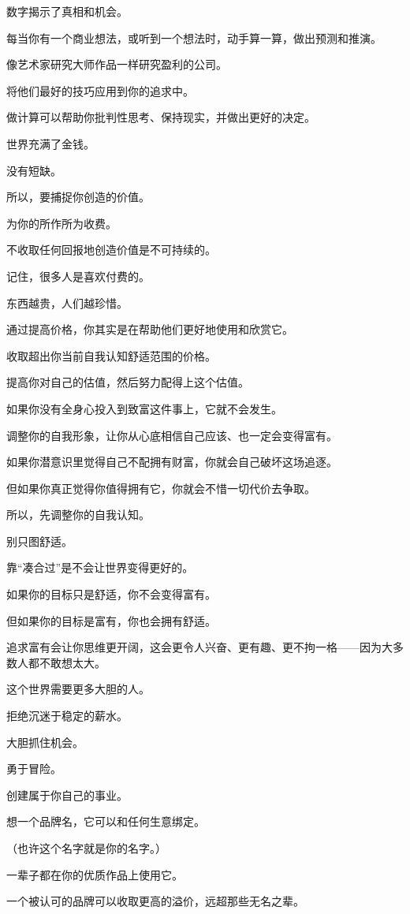 \documentclass[
]{article}
\begin{document}
数字揭示了真相和机会。

每当你有一个商业想法，或听到一个想法时，动手算一算，做出预测和推演。

像艺术家研究大师作品一样研究盈利的公司。

将他们最好的技巧应用到你的追求中。

做计算可以帮助你批判性思考、保持现实，并做出更好的决定。

世界充满了金钱。

没有短缺。

所以，要捕捉你创造的价值。

为你的所作所为收费。

不收取任何回报地创造价值是不可持续的。

记住，很多人是喜欢付费的。

东西越贵，人们越珍惜。

通过提高价格，你其实是在帮助他们更好地使用和欣赏它。

收取超出你当前自我认知舒适范围的价格。

提高你对自己的估值，然后努力配得上这个估值。

如果你没有全身心投入到致富这件事上，它就不会发生。

调整你的自我形象，让你从心底相信自己应该、也一定会变得富有。

如果你潜意识里觉得自己不配拥有财富，你就会自己破坏这场追逐。

但如果你真正觉得你值得拥有它，你就会不惜一切代价去争取。

所以，先调整你的自我认知。

别只图舒适。

靠``凑合过''是不会让世界变得更好的。

如果你的目标只是舒适，你不会变得富有。

但如果你的目标是富有，你也会拥有舒适。

追求富有会让你思维更开阔，这会更令人兴奋、更有趣、更不拘一格------因为大多数人都不敢想太大。

这个世界需要更多大胆的人。

拒绝沉迷于稳定的薪水。

大胆抓住机会。

勇于冒险。

创建属于你自己的事业。

想一个品牌名，它可以和任何生意绑定。

（也许这个名字就是你的名字。）

一辈子都在你的优质作品上使用它。

一个被认可的品牌可以收取更高的溢价，远超那些无名之辈。
\end{document}
